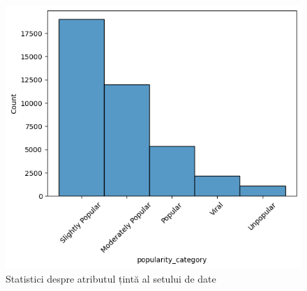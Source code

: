 \documentclass{article}
\begin{document}
\begin{figure}[htb]
    \centering
    \includegraphics[scale=0.5]{news_popularity/analysis/categorical/target.png}
    \caption{Statistici despre atributul țintă al setului de date}
    \label{fig:news:cat_target}
\end{figure}
\end{document}
